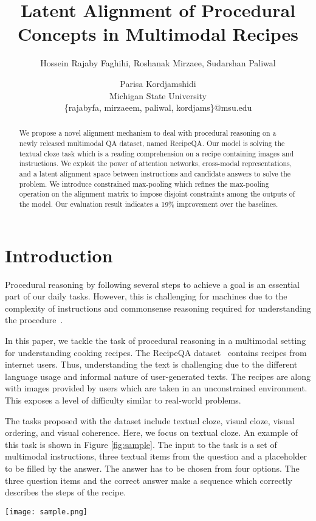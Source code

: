 \documentclass[11pt,a4paper]{article}
\title{Latent Alignment of Procedural Concepts in Multimodal Recipes}
\author{
Hossein Rajaby Faghihi,
Roshanak Mirzaee,
Sudarshan Paliwal\and
Parisa Kordjamshidi\\
Michigan State University\\
\{rajabyfa, mirzaeem, paliwal, kordjams\}@msu.edu
}
\date{}
\begin{document}
\maketitle
\begin{abstract}
We propose a novel alignment mechanism to deal with procedural reasoning on a newly released multimodal QA dataset, named RecipeQA. Our model is solving the textual cloze task which is a reading comprehension on a recipe containing images and instructions. We exploit the power of attention networks, cross-modal representations, and a latent alignment space between instructions and candidate answers to solve the problem. We introduce constrained max-pooling which refines the max-pooling operation on the alignment matrix to impose disjoint constraints among the outputs of the model. Our evaluation result indicates a 19\% improvement over the baselines. 
\end{abstract}

\section{Introduction}

Procedural reasoning by following several steps to achieve a goal is an essential part of our daily tasks. However, this is challenging for machines due to the complexity of instructions and commonsense reasoning required for understanding the procedure~\cite{mishra2018tracking,yagcioglu2018recipeqa,bosselut2017simulating}.

In this paper, we tackle the task of procedural reasoning in a multimodal setting for understanding cooking recipes.
The RecipeQA dataset~\cite{yagcioglu2018recipeqa} contains recipes from internet users. Thus, understanding the text is challenging due to the different language usage and informal nature of user-generated texts. The recipes are along with images provided by users which are taken in an unconstrained environment. This exposes a level of difficulty similar to real-world problems. 

The tasks proposed with the dataset include textual cloze, visual cloze, visual ordering, and visual coherence. 
Here, we focus on textual cloze. An example of this task is shown in Figure \ref{fig:sample}. The input to the task is a set of multimodal instructions, three textual items from the question and a placeholder to be filled by the answer. The answer has to be chosen from four options. The three question items and the correct answer make a sequence which correctly describes the steps of the recipe.
\begin{figure*}[t]
    \centering
    \texttt{[image: sample.png]}
    \caption{A sample of textual cloze task}
    \label{fig:sample}
\end{figure*}
\end{document}
